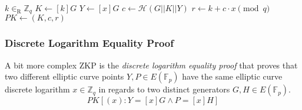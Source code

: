 \begin{algorithm}[H]
\DontPrintSemicolon
    \caption{\( \mathbf{Prove}_G (x) \)}
    \( k \in_\mathrm{R} \mathbb{Z}_q \)\;
    \( K \gets [k]G \)\;
    \( Y \gets [x]G \)\;
    \( c \gets \mathcal{H}(G || K || Y) \) 
    \( r \gets k + c \cdot x \pmod q \)\;
    \( PK \gets (K, c, r) \)\;
     
\end{algorithm}

\begin{algorithm}[H]
\DontPrintSemicolon
    \caption{\( \mathbf{Verify}_G (PK, Y) \)}
     
\end{algorithm}



\subsubsection{Discrete Logarithm Equality Proof}
A bit more complex ZKP is the \textit{discrete logarithm equality proof} that proves that two different elliptic curve points \( Y, P \in E(\mathbb{F}_p) \) have the same elliptic curve discrete logarithm \( x \in \mathbb{Z}_q \) in regards to two distinct generators \( G, H \in E(\mathbb{F}_p) \).
\[
PK[(x) : Y = [x]G \wedge P = [x]H]
\]

